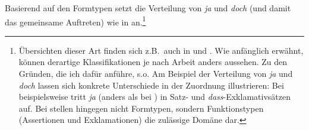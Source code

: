 \begin{table}
\caption{Satzmodus\label{tab:262}}
\end{table}
Basierend auf den Formtypen setzt \citet[49]{Thurmair1989} die Verteilung von \textit{ja} und \textit{doch} (und damit das gemeinsame Auftreten) wie in  an.\footnote{Übersichten dieser Art finden sich z.B.\ auch in \citet[59]{Karagjosova2004} und \citet[183]{Kwon2005}. Wie anfänglich erwähnt, können derartige Klassifikationen je nach Arbeit anders aussehen. Zu den Gründen, die ich dafür anführe, s.o. Am Beispiel der Verteilung von \textit{ja} und \textit{doch} lassen sich konkrete Unterschiede in der Zuordnung illustrieren: Bei \citet{Karagjosova2004} beispielsweise tritt \textit{ja} (anders als bei \citealt{Thurmair1989}) in Satz- und \textit{dass}-Exklamativsätzen auf. Bei \citet[157]{Hentschel1986} stellen hingegen nicht Formtypen, sondern Funktionstypen (Assertionen und Exkla\-mationen) die zulässige Domäne dar.}

